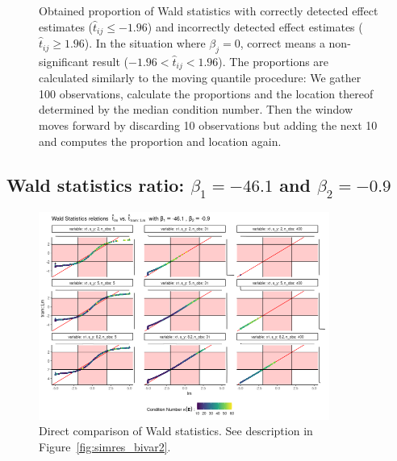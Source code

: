 \documentclass[11pt,a4paper,twoside]{book}\usepackage[]{graphicx}\usepackage[]{xcolor}
\begin{document}
\begin{figure}[H]
\begin{subfigure}[b]{1\textwidth}
\end{subfigure}
\vspace*{-0.9cm}
\caption{Obtained proportion of Wald statistics with correctly detected effect estimates ($\hat{t}_{ij}\leq -1.96$) and incorrectly detected effect estimates ($\hat{t}_{ij}\geq 1.96$). In the situation where $\beta_j=0$, correct means a non-significant result ($-1.96<\hat{t}_{ij}< 1.96$). The proportions are calculated similarly to the moving quantile procedure: We gather 100 observations, calculate the proportions and the location thereof determined by the median condition number. Then the window moves forward by discarding 10 observations but adding the next 10 and computes the proportion and location again. }
\label{fig:simres_prop2}
\end{figure}

\vspace*{-1cm}
\subsection{Wald statistics ratio: $\beta_1=-46.1$ and $\beta_2=-0.9$}\label{sec:compwald1}
\begin{figure}[H]
\vspace*{-0.5cm}
\centering
\includegraphics[width=0.85\textwidth]{../fromsim/simres_bivar11-1.png}
\vspace*{-0.5cm}
\caption{Direct comparison of Wald statistics. See description in Figure~\ref{fig:simres_bivar2}.}
\label{fig:simres_bivar1}
\end{figure}

\end{document}
